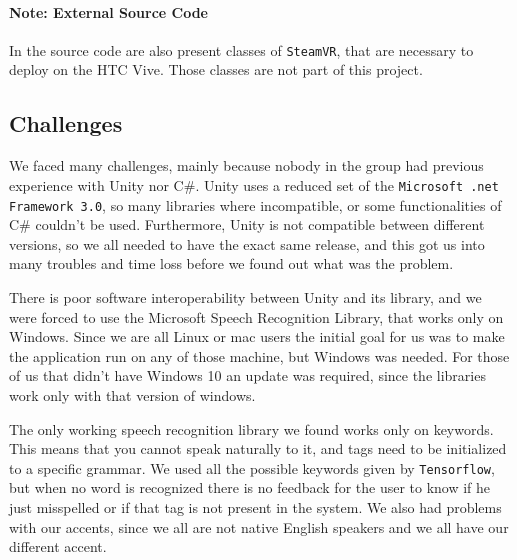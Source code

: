 \documentclass[11pt,a4paper]{article}
\begin{document}
\paragraph{Note: External Source Code}
In the source code are also present classes of \texttt{SteamVR}, that are necessary to deploy on the HTC Vive.
Those classes are not part of this project.

\subsection{Challenges}







We faced many challenges, mainly because nobody in the group had previous experience with Unity nor C$\#$.
Unity uses a reduced set of the \texttt{Microsoft .net Framework 3.0}, so many libraries where incompatible, or some functionalities of C$\#$ couldn't be used.
Furthermore, Unity is not compatible between different versions, so we all needed to have the exact same release, and this got us into many troubles and time loss before we found out what was the problem.

There is poor software interoperability between Unity and its library, and we were forced to use the Microsoft Speech Recognition Library, that works only on Windows. 
Since we are all Linux or mac users the initial goal for us was to make the application run on any of those machine, but Windows was needed.
For those of us that didn't have Windows 10 an update was required, since the libraries work only with that version of windows.

The only working speech recognition library we found works only on keywords. This means that you cannot speak naturally to it, and tags need to be initialized to a specific grammar. We used all the possible keywords given by \texttt{Tensorflow}, but when no word is recognized there is no feedback for the user to know if he just misspelled or if that tag is not present in the system.
We also had problems with our accents, since we all are not native English speakers and we all have our different accent.
\end{document}
